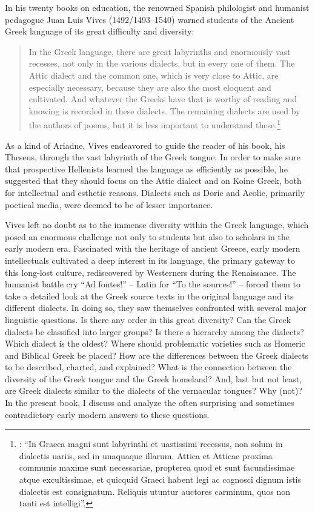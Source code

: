 \addchap{\lsPrefaceTitle}\label{ch:preface}

In his twenty books on education, the renowned Spanish philologist and humanist pedagogue Juan Luis Vives (1492/1493–1540) warned students of the Ancient Greek language of its great difficulty and diversity:

\begin{quote}
In the Greek language, there are great labyrinths and enormously vast recesses, not only in the various dialects, but in every one of them. The Attic dialect and the common one, which is very close to Attic, are especially necessary, because they are also the most eloquent and cultivated. And whatever the Greeks have that is worthy of reading and knowing is recorded in these dialects. The remaining dialects are used by the authors of poems, but it is less important to understand these.\footnote{\citet[e3\textsuperscript{v}]{Vives1531}: “In Graeca magni sunt labyrinthi et uastissimi recessus, non solum in dialectis uariis, sed in unaquaque illarum. Attica et Atticae proxima communis maxime sunt necessariae, propterea quod et sunt facundissimae atque excultissimae, et quicquid Graeci habent legi ac cognosci dignum istis dialectis est consignatum. Reliquis utuntur auctores carminum, quos non tanti est intelligi”.}
\end{quote}

As a kind of Ariadne, Vives endeavored to guide the reader of his book, his Theseus, through the vast labyrinth of the Greek tongue. In order to make sure that prospective Hellenists learned the language as efficiently as possible, he suggested that they should focus on the Attic dialect and on Koine Greek, both for intellectual and esthetic reasons. Dialects such as Doric and Aeolic, primarily poetical media, were deemed to be of lesser importance.

Vives left no doubt as to the immense diversity within the Greek language, which posed an enormous challenge not only to students but also to scholars in the early modern era. Fascinated with the heritage of ancient Greece, early modern intellectuals cultivated a deep interest in its language, the primary gateway to this long-lost culture, rediscovered by Westerners during the Renaissance. The humanist battle cry “Ad fontes!” – Latin for “To the sources!” – forced them to take a detailed look at the Greek source texts in the original language and its different dialects. In doing so, they saw themselves confronted with several major linguistic questions. Is there any order in this great diversity? Can the Greek dialects be classified into larger groups? Is there a hierarchy among the dialects? Which dialect is the oldest? Where should problematic varieties such as Homeric and Biblical Greek be placed? How are the differences between the Greek dialects to be described, charted, and explained? What is the connection between the diversity of the Greek tongue and the Greek homeland? And, last but not least, are Greek dialects similar to the dialects of the vernacular tongues? Why (not)? In the present book, I discuss and analyze the often surprising and sometimes contradictory early modern answers to these questions.
